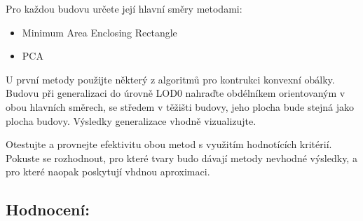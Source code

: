 \documentclass[12pt, a4paper]{article}
\begin{document}
\noindent Pro každou budovu určete její hlavní směry metodami:
\vspace{3mm}
\begin{itemize}
    \item Minimum Area Enclosing Rectangle
    \item PCA
\end{itemize}
\vspace{3mm}

\noindent U první metody použijte některý z algoritmů pro kontrukci konvexní obálky. Budovu při generalizaci do úrovně LOD0 nahraďte obdélníkem orientovaným v obou hlavních směrech, se středem v těžišti budovy, jeho plocha bude stejná jako plocha budovy. Výsledky generalizace vhodně vizualizujte.
\vspace{3mm}

\noindent Otestujte a provnejte efektivitu obou metod s využitím hodnotících kritérií. Pokuste se rozhodnout, pro které tvary budo dávají metody nevhodné výsledky, a pro které naopak poskytují vhdnou aproximaci. 

\vspace{1cm}
\subsection*{\textbf{Hodnocení:}}

\begin{center}
\end{center}
\vspace{0.5 cm}
\end{document}
